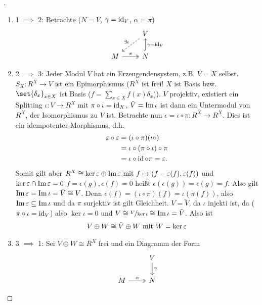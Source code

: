 \begin{proof}[]
	\begin{enumerate}
		\item 1 $\implies$ 2: Betrachte ($N = V$, $\gamma = \id_V$, $\alpha = \pi$)
		\[
			\begin{tikzcd}
			& V \arrow[ld, "\exists \iota"', dashed] \\
			M \arrow[r, "\pi", two heads] & N \arrow[u, "\gamma = \id_V"', hook]  
			\end{tikzcd}
		\]
		\item 2 $\implies$ 3: Jeder Modul $V$ hat ein Erzeugendensystem, z.B. $V = X$ selbst. $S_X\colon R^X \to V$ ist ein Epimorphismus ($R^X$ ist frei! $X$ ist Basis bzw. $\set{\delta_x}_{x \in X}$ ist Basis ($f = \sum_{x\in X} f(x)\delta_x$)). $V$ projektiv, existiert ein Splitting $\iota \colon V \to R^X$ mit $\pi \circ \iota = \id_X$, $\tilde{V} = \Image \iota$ ist dann ein Untermodul von $R^X$, der Isomorphismus zu $V$ ist. Betrachte nun $\epsilon = \iota \circ \pi \colon R^X \to R^X$. Dies ist ein idempotenter Morphismus, d.h. 
		\begin{align*}
			\epsilon \circ \epsilon &= (\iota \circ \pi)(\iota \circ)\\
			&= \iota \circ (\pi \circ \iota)\circ \pi\\
			&= \iota \circ \id \circ \pi = \epsilon.
		\end{align*}
		Somit gilt aber $R^X \cong \ker \epsilon \oplus \Image \epsilon \mit f \mapsto (f - \epsilon(f), \epsilon(f))$ und $\ker \epsilon \cap \Image \epsilon = 0$ %
		$f = \epsilon(g), \epsilon(f) = 0$ heißt $\epsilon(\epsilon(g)) = \epsilon(g) = f$. Also gilt $\Image \epsilon = \Image \iota = \tilde{V} \cong V$. Denn $\epsilon(f) = (\iota \circ \pi)(f) = \iota(\pi(f))$, also $\Image \epsilon \subseteq \Image \iota$ und da $\pi$ surjektiv ist gilt Gleichheit. $V = \tilde{V}$, da $\iota$ injekti ist, da ($\pi \circ \iota = \id_V$) also $\ker \iota = 0$ und $V \cong \lnkset{V}{\ker \iota} \cong \Image \iota = \tilde{V}$. Also ist
		\begin{align*}
			V \oplus W \cong \tilde{V} \oplus W \mit W = \ker \epsilon
		\end{align*}
		\item 3 $\implies$ 1: Sei $V \oplus W \cong R^X$ frei und ein Diagramm der Form
		\[
			\begin{tikzcd}[ampersand replacement=\&]
			\& V \arrow[d, "\gamma"] \\
			M \arrow[r, "\alpha", two heads] \& N

\end{tikzcd}\]
\end{enumerate}
\end{proof}
